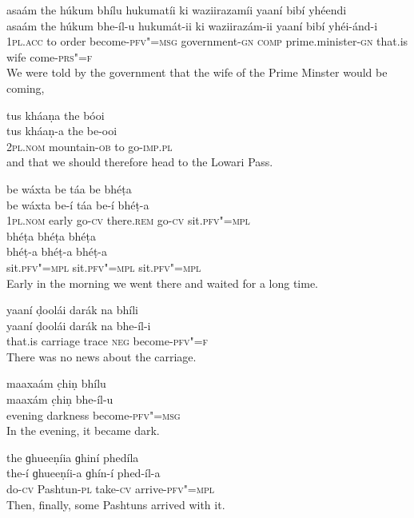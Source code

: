 \begin{exe}
\ex
\label{ex:A1-1}
\glll asaám	the	húkum	bhílu	hukumatíi	ki waziirazamíi	yaaní	bibí	yhéendi \\
asaám	the	húkum	bhe-íl-u	hukumát-ii	ki waziirazám-ii	yaaní	bibí	yhéi-ánd-i \\
\textsc{1pl.acc} to	order	become-\textsc{pfv"=msg} government-\textsc{gn} \textsc{comp} prime.minister-\textsc{gn} that.is	wife	come-\textsc{prs"=f} \\
\glt We were told by the government that the wife of the Prime Minster would be coming,

\ex
\label{ex:2}
\glll tus	kháaṇa	the	bóoi \\
tus	kháaṇ-a the	be-ooi \\
\textsc{2pl.nom} mountain-\textsc{ob} to go-\textsc{imp.pl} \\
\glt and that we should therefore head to the Lowari Pass.

\ex
\label{ex:3}
\glll be	wáxta	be	táa	be	bhéṭa \\
be	wáxta	be-í	táa	be-í	bhéṭ-a \\
\textsc{1pl.nom}	early	go-\textsc{cv}	there.\textsc{rem}	go-\textsc{cv}	sit.\textsc{pfv"=mpl} \\
\glll bhéṭa	bhéṭa	bhéṭa \\
bhéṭ-a	bhéṭ-a	bhéṭ-a \\
sit.\textsc{pfv"=mpl}	sit.\textsc{pfv"=mpl}	sit.\textsc{pfv"=mpl} \\
\glt Early in the morning we went there and waited for a long time.

\ex
\label{ex:4}
\glll yaaní	ḍoolái	darák	na	bhíli \\
yaaní	ḍoolái	darák	na	bhe-íl-i \\
that.is	carriage	trace	\textsc{neg}	become-\textsc{pfv"=f} \\
\glt There was no news about the carriage.

\ex
\label{ex:5}
\glll maaxaám	c̣hiṇ	bhílu \\
maaxám	c̣hiṇ	bhe-íl-u \\
evening	darkness	become-\textsc{pfv"=msg} \\
\glt In the evening, it became dark.

\ex
\label{ex:6}
\glll the	ɡhueeṇíia	ɡhiní	phedíla \\
the-í	ɡhueeṇíi-a	ɡhín-í	phed-íl-a \\
do-\textsc{cv}	Pashtun-\textsc{pl}	take-\textsc{cv}	arrive-\textsc{pfv"=mpl} \\
\glt Then, finally, some Pashtuns arrived with it.


\end{exe}
